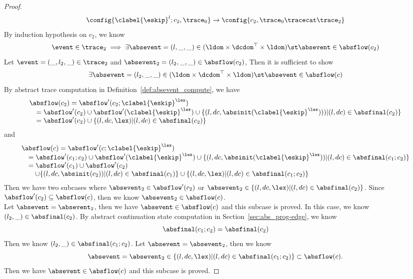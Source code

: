 \begin{proof}
\[{      \config{{\clabel{\eskip}^l; c_2, \trace_0}} 
      \xrightarrow{} 
      \config{{c_2, \trace_0 \tracecat \trace_2}}
      }
    \]
    By induction hypothesis on $c_2$, we know 
    \[
      \event \in \trace_2
      \implies
      \exists \absevent = (l, \_, \_) \in (\ldom \times \dcdom^{\top} \times \ldom) \st 
      \absevent \in \absflow(c_2)
    \]
    Let $\event = (\_, l_2, \_) \in \trace_2$ and $\absevent_2 = (l_2, \_, \_) \in \absflow(c_2)$,
    Then it is sufficient to show
    \[
      \exists \absevent = (l_2, \_, \_) \in (\ldom \times \dcdom^{\top} \times \ldom) \st 
      \absevent \in \absflow(c)
    \]
    By abstract trace computation in Definition~\ref{def:absevent_compute}, we have
    \[
      \begin{array}{l}
        \absflow(c_2) = \absflow'(c_2; \clabel{\eskip}^{\lex}) 
        \\ \quad
        = \absflow'(c_2) \cup \absflow'(\clabel{\eskip}^{\lex}) 
        \cup \{ (l, dc, \absinit(\clabel{\eskip}^{\lex}))) | (l, dc) \in \absfinal(c_2) \} 
        \\ \quad
        = \absflow'(c_2) \cup  \{ (l, dc, \lex) | (l, dc) \in \absfinal(c_2) \} 
     \end{array}
    \]  
    and 
    \[
      \begin{array}{l}
        \absflow(c) = \absflow'(c; \clabel{\eskip}^{\lex}) 
        \\ \quad
        = \absflow'(c_1;c_2) \cup \absflow'(\clabel{\eskip}^{\lex}) 
        \cup \{ (l, dc, \absinit(\clabel{\eskip}^{\lex})) | (l, dc) \in \absfinal(c_1; c_2) \} 
        \\ \quad  
        = \absflow'(c_1) \cup \absflow'(c_2) 
        \\ \quad \quad
        \cup \{ (l, dc, \absinit(c_2)) | (l, dc) \in \absfinal(c_1) \} 
        \cup \{ (l, dc, \lex) | (l, dc) \in \absfinal(c_1; c_2) \} 
     \end{array}
    \]
    Then we have two subcases where 
    $\absevent_2 \in \absflow'(c_2)$ or $\absevent_2 \in \{ (l, dc, \lex) | (l, dc) \in \absfinal(c_2) \}$.
    Since $\absflow'(c_2) \subseteq \absflow(c)$, then we know $\absevent_2 \in \absflow(c)$.
    \\
    Let $\absevent = \absevent_2$, then we have $\absevent \in \absflow(c)$ and this subcase is proved.
    In this case, we know $(l_2, \_) \in \absfinal(c_2)$. By abstract continuation state computation in Section~\ref{sec:abs_prog-edge}, we know
    \[
      \absfinal(c_1; c_2) =  \absfinal(c_2) 
    \]
    Then we know $(l_2, \_) \in \absfinal(c_1; c_2)$. Let $\absevent = \absevent_2$, then we know 
    \[
      \absevent = \absevent_2 \in   \{ (l, dc, \lex) | (l, dc) \in \absfinal(c_1; c_2) \}  \subset\absflow(c).
    \]
    Then we have $\absevent \in \absflow(c)$ and this subcase is proved.
  \end{proof}
  
